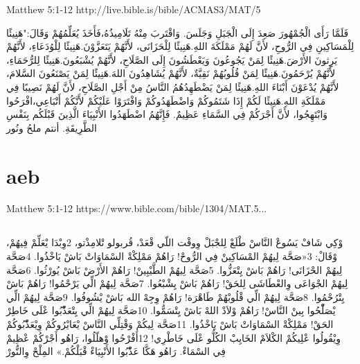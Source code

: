 \documentclass[12pt,fleqn,titlepage,twoside,a4paper]{book}
\begin{document}
Matthew 5:1-12 http://live.bible.is/bible/ACMAS3/MAT/5

\begin{arab}[utf]

فَلَمَّا رَأَى الْجُمْهُورَ صَعِدَ إِلَى الْجَبَلِ وَجَلَسَ. وَاقْتَربَ مِنْهُ تَلَامِيذُهُ،فَأَخَذَ يُعَلِّمُهُمْ وَقَالَ:"هَنِيئًا لِلْمَسَاكِينِ فِي الرُّوحِ، لأَنَّ لَهُمْ مَمْلَكَةَ اللهِ.هَنِيئًا لِلْحَزَانَى، لأَنَّهُمْ يَتَعَزَّوْنَ.هَنِيئًا لِلْوُدَعَاءِ، لأَنَّهُمْ يَرِثونَ الأَرْضَ.هَنِيئًا لِمَنْ يَجُوعُونَ وَيَعْطَشُونَ إِلَى الصَّلَاحِ، لأَنَّهُمْ يُشْبَعُونَ.هَنِيئًا لِلرُّحَمَاءِ، لأَنَّهُمْ يُرْحَمُونَ.هَنِيئًا لِمَنْ قُلُوبُهُمْ نَقِيَّةٌ، لأَنَّهُمْ يُشَاهِدُونَ اللهَ.هَنِيئًا لِمَنْ يَصْنَعُونَ السَّلامَ، لأَنَّهُمْ يُدْعَوْنَ أَبْنَاءَ اللهِ.هَنِيئًا لِمَنْ يَضْطَهِدُهُمُ النَّاسُ مِنْ أَجْلِ الصَّلَاحِ، لأَنَّ لَهُمْ نَصِيبًا فِي مَمْلَكَةِ اللهِ.هَنِيئًا لَكُمْ إِذَا شَتَمُوكُمْ وَاضْطَهَدُوكُمْ وَافْتَرَوْا عَلَيْكُمْ لأَنَّكُمْ أَتْبَاعِي،افْرَحُوا وَابْتَهِجُوا، لأَنَّ أَجْرَكُمْ فِي السَّمَاءِ عَظِيمٌ. فَإِنَّهُمُ اضْطَهَدُوا الأَنْبِيَاءَ الَّذِينَ قَبْلَكُم بِنَفْسِ الطَّرِيقَةِ. أنتم ملحُ ونُور
\end{arab}

\section{aeb}

Matthew 5:1-12 https://www.bible.com/bible/1304/MAT.5...

\begin{arab}[utf]
\section*{}


وْكِي شَافْ يَسُوعْ النَّاسْ طْلَعْ لِلجْبَلْ وِوقْت اللّي قْعَدْ، قُربولو تْلامِذْتو، 2وِبْدَا يْعَلِّمْ فِيهُمْ، وْقَالْ:
3«صَحَّة لِيهُمْ المْسَاكِينْ فِي الرُّوحْ!
رَاهُمْ مَمْلِكْةْ السْمَاوَاتْ بَاشْ يَاخْذُوا.
4صَحَّة لِيهُمْ الحْزَانَى!
رَاهُمْ بَاشْ يِتْعَزُّوا.
5صَحَّة لِيهُمْ الطَّيْبِينْ!
رَاهُمْ الأَرْضْ بَاشْ يُورْثُوا.
6صَحَّة لِيهُمْ الجْوَاعَى وِالعْطَاشَى لِلحَقْ!
رَاهُمْ بَاشْ يِشْبْعُوا.
7صَحَّة لِيهُمْ الِّي يَرْحْمُوا!
رَاهُمْ بَاشْ يِتْرُحْمُوا.
8صَحَّة لِيهُمْ الِّي قْلُوبْهُمْ طَاهْرَة!
رَاهُمْ وِجِهْ الله بَاشْ يْشُوفُوا.
9صَحَّة لِيهُمْ الِّي يْصَلّْحُوا بِينْ النَّاسْ!
رَاهُمْ وْلاَدْ اللهْ بَاشْ يِتْسَمُّوا.
10صَحَّة لِيهُمْ الِّي يِتْعَذّْبُوا عْلَى خَاطِرْ الحَقْ!
مَمْلِكْةْ السْمَاوَاتْ بَاشْ يَاخْذُوا.
11صَحَّة لِيكُمْ وَقْتِلِّي النَّاسْ يْعَايْرُوكُمْ وِيْعَذّْبُوكُمْ وِيْقُولُوا عْلِيكُمْ الكْلاَمْ الخَايِبْ الكُلُّو عْلَى خَاطْرِي! 12أَفْرْحُوا وْهلّلُوا، رَاهُو أَجْرْكُمْ عْظِيمْ فِي السْمَاءْ. رَاهُو هَكَّا عَذّْبُوا الأَنْبِيَاءْ قْبَلْكُمْ.»
المِلْحْ وِالنُّورْ

\end{arab}
\end{document}
